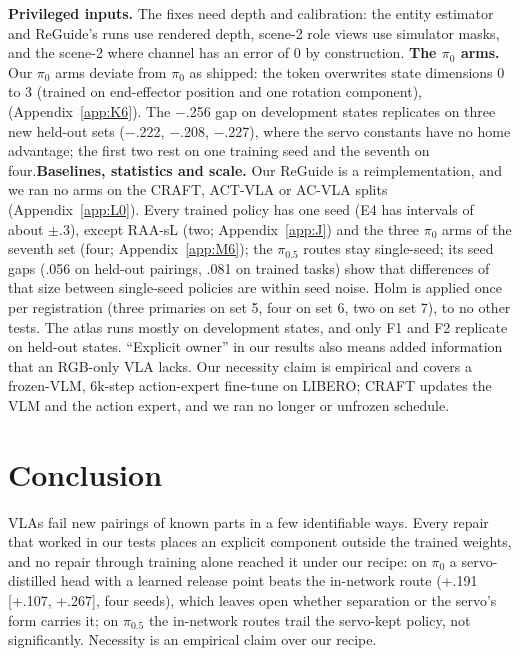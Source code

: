 \documentclass{article}
\newcommand{\mi}{$-$}
\newcommand{\pifive}{$\pi_{0.5}$}
\newcommand{\pizero}{$\pi_0$}
\begin{document}
\textbf{Privileged inputs.} The fixes need depth and calibration: the entity estimator and ReGuide's runs use rendered depth, scene-2 role views use simulator masks, and the scene-2 where channel has an error of 0 by construction.
\textbf{The \pizero{} arms.} Our \pizero{} arms deviate from \pizero{} as shipped: the token overwrites state dimensions 0 to 3 (trained on end-effector position and one rotation component), (Appendix~\ref{app:K6}). The \mi.256 gap on development states replicates on three new held-out sets (\mi.222, \mi.208, \mi.227), where the servo constants have no home advantage; the first two rest on one training seed and the seventh on four.\textbf{Baselines, statistics and scale.} Our ReGuide is a reimplementation, and we ran no arms on the CRAFT, ACT-VLA or AC-VLA splits (Appendix~\ref{app:L0}). Every trained policy has one seed (E4 has intervals of about $\pm.3$), except RAA-sL (two; Appendix~\ref{app:J}) and the three \pizero{} arms of the seventh set (four; Appendix~\ref{app:M6}); the \pifive{} routes stay single-seed; its seed gaps (.056 on held-out pairings, .081 on trained tasks) show that differences of that size between single-seed policies are within seed noise. Holm is applied once per registration (three primaries on set 5, four on set 6, two on set 7), to no other tests. The atlas runs mostly on development states, and only F1 and F2 replicate on held-out states. ``Explicit owner'' in our results also means added information that an RGB-only VLA lacks. Our necessity claim is empirical and covers a frozen-VLM, 6k-step action-expert fine-tune on LIBERO; CRAFT updates the VLM and the action expert, and we ran no longer or unfrozen schedule.

\section{Conclusion}
\label{sec:conclusion}

VLAs fail new pairings of known parts in a few identifiable ways. Every repair that worked in our tests places an explicit component outside the trained weights, and no repair through training alone reached it under our recipe: on \pizero{} a servo-distilled head with a learned release point beats the in-network route (+.191 [+.107, +.267], four seeds), which leaves open whether separation or the servo's form carries it; on \pifive{} the in-network routes trail the servo-kept policy, not significantly. Necessity is an empirical claim over our recipe.
\end{document}
